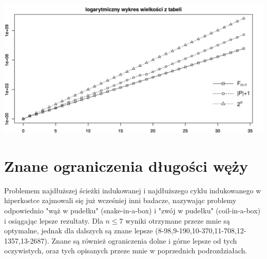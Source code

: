 \documentclass{pracamgr}
\begin{document}
     \begin{center}
      \includegraphics[scale=0.55]{img/plot1.jpg}
     \end{center}
   \section{Znane ograniczenia długości węży}
    Problemem najdłuższej ścieżki indukowanej i najdłuższego cyklu indukowanego w hiperkostce zajmowali się już wcześniej inni badacze, nazywając
    problemy odpowiednio "wąż w pudełku" (snake-in-a-box) i "zwój w pudełku" (coil-in-a-box) i osiągając lepsze rezultaty.\newline
    Dla $n\le7$ wyniki otrzymane przeze mnie są optymalne, jednak dla dalszych są znane lepsze\newline
    (8-98,9-190,10-370,11-708,12-1357,13-2687).
    Znane są również ograniczenia dolne i górne lepsze od tych oczywistych, oraz tych opisanych przeze mnie w poprzednich podrozdziałach.
\end{document}
